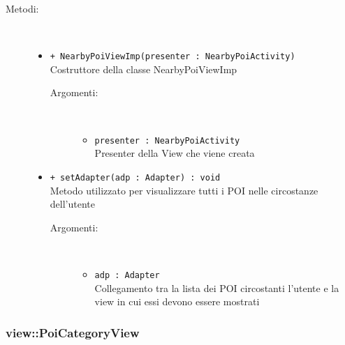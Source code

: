 \documentclass[../DefinizioneDiProdotto.tex]{subfiles}
\begin{document}
\begin{description}
\begin{itemize}
\end{itemize}
\item[Metodi:] \
\begin{itemize}
\item \texttt{+ NearbyPoiViewImp(presenter : NearbyPoiActivity)}\\
Costruttore della classe NearbyPoiViewImp
 \begin{description}
\item[Argomenti:] \
\begin{itemize}
\item \texttt{presenter : NearbyPoiActivity}\\
Presenter della View che viene creata\end{itemize}
\end{description}
\item \texttt{+ setAdapter(adp : Adapter) : void}\\
Metodo utilizzato per visualizzare tutti i POI nelle circostanze dell'utente
 \begin{description}
\item[Argomenti:] \
\begin{itemize}
\item \texttt{adp : Adapter}\\
Collegamento tra la lista dei POI circostanti l'utente e la view in cui essi devono essere mostrati\end{itemize}
\end{description}
\end{itemize}
\end{description}

\subsubsection{view::PoiCategoryView}
\end{document}

